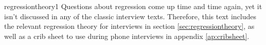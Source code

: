 \begin{answer}{regressiontheory1}
Questions about regression come up time and time again, yet it isn't discussed in any of the classic interview texts.
Therefore, this text includes the relevant regression theory for interviews in section \ref{sec:regressiontheory}, as well as a crib sheet to use during phone interviews in
appendix \ref{ap:cribsheet}.
\end{answer}
